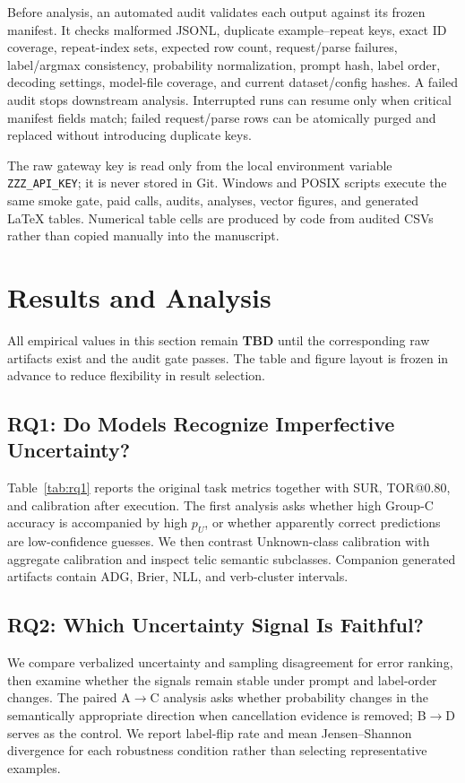 \documentclass[letterpaper]{article}
\begin{document}
Before analysis, an automated audit validates each output against its frozen manifest. It checks malformed JSONL, duplicate example--repeat keys, exact ID coverage, repeat-index sets, expected row count, request/parse failures, label/argmax consistency, probability normalization, prompt hash, label order, decoding settings, model-file coverage, and current dataset/config hashes. A failed audit stops downstream analysis. Interrupted runs can resume only when critical manifest fields match; failed request/parse rows can be atomically purged and replaced without introducing duplicate keys.

The raw gateway key is read only from the local environment variable \texttt{ZZZ\_API\_KEY}; it is never stored in Git. Windows and POSIX scripts execute the same smoke gate, paid calls, audits, analyses, vector figures, and generated LaTeX tables. Numerical table cells are produced by code from audited CSVs rather than copied manually into the manuscript.



\section{Results and Analysis}
All empirical values in this section remain \textbf{TBD} until the corresponding raw artifacts exist and the audit gate passes. The table and figure layout is frozen in advance to reduce flexibility in result selection.

\subsection{RQ1: Do Models Recognize Imperfective Uncertainty?}
Table~\ref{tab:rq1} reports the original task metrics together with SUR, TOR@0.80, and calibration after execution. The first analysis asks whether high Group-C accuracy is accompanied by high $p_U$, or whether apparently correct predictions are low-confidence guesses. We then contrast Unknown-class calibration with aggregate calibration and inspect telic semantic subclasses. Companion generated artifacts contain ADG, Brier, NLL, and verb-cluster intervals.



\subsection{RQ2: Which Uncertainty Signal Is Faithful?}
We compare verbalized uncertainty and sampling disagreement for error ranking, then examine whether the signals remain stable under prompt and label-order changes. The paired A$\rightarrow$C analysis asks whether probability changes in the semantically appropriate direction when cancellation evidence is removed; B$\rightarrow$D serves as the control. We report label-flip rate and mean Jensen--Shannon divergence for each robustness condition rather than selecting representative examples.
\end{document}
